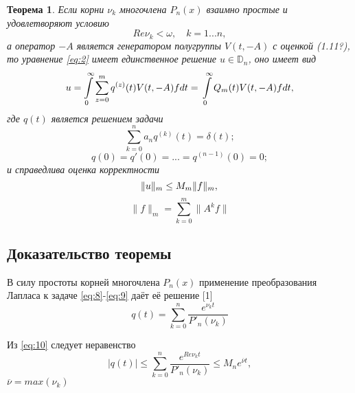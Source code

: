 \documentclass[14pt,a4paper]{article}
\theoremstyle{plain}
\newtheorem{theorem}{Теорема}[section]
\numberwithin{equation}{section}
\begin{document}
\begin{theorem}
    Если корни $\nu_k$ многочлена $P_n(x)$ взаимно простые и удовлетворяют условию
    \begin{equation}
        \label{eq:13}
        Re \nu_k < \omega, \quad k = 1...n,
    \end{equation}
    а оператор $-A$ является генератором полугруппы $V(t, -A)$ с оценкой (1.11?), то уравнение
    \ref{eq:2} имеет единственное решение $u \in \mathbb{D}_n$, оно имеет вид
    \begin{equation}
        u = \int\limits_0^\infty \sum_{z=0}^{m} q^{(z)}(t) V(t, -A) fdt = \\
        \int\limits_0^\infty Q_m (t) V(t, -A)fdt,
    \end{equation}
    где $q(t)$ является решением задачи
    \begin{equation}
        \label{eq:8}
        \sum_{k=0}^{n} a_n q^{(k)}(t) = \delta(t);
    \end{equation}
    \begin{equation}
        \label{eq:9}
        q(0) = q'(0) = ... = q^{(n-1)}(0) = 0;
    \end{equation}
    и справедлива оценка корректности
    \begin{equation}
        \label{eq:15}
        \|u\|_m \le M_m \|f\|_m, \\
    \end{equation}
    \begin{equation*}
        \|f\|_m = \sum_{k=0}^{m} \|A^k f\|
    \end{equation*}
\end{theorem}

\subsection{Доказательство теоремы}

В силу простоты корней многочлена $P_n(x)$ применение преобразования Лапласа к задаче \ref{eq:8}-\ref{eq:9}
даёт её решение [1]
\begin{equation}
    \label{eq:10}
    q(t) = \sum_{k=0}^{n} \frac{e^{\nu_{k}t}}{P'_n(\nu_k)}
\end{equation}

Из \ref{eq:10} следует неравенство
\begin{equation}
    \label{eq:11}
    |q(t)| \le \sum_{k=0}^{n} \frac{e^{Re \nu_k t}}{P'_n(\nu_k)} \le M_n e^{\overline{\nu} t},
\end{equation}
$\overline{\nu} = max(\nu_k)$
\end{document}
